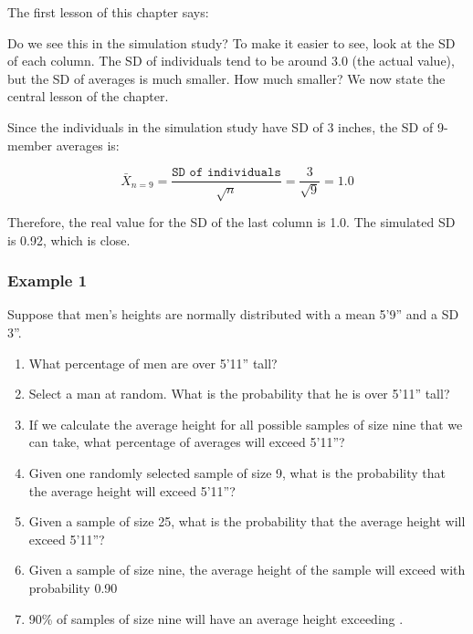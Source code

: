 \documentclass[11pt, chapterprefix=true]{scrbook}\usepackage[]{graphicx}\usepackage[]{color}
\begin{document}
The first lesson of this chapter says:


Do we see this in the simulation study?  To make it easier to see, look at the SD of each column.  The SD of individuals tend to be around 3.0 (the actual value), but the SD of averages is much smaller.  How much smaller?  We now state the central lesson of the chapter.


Since the individuals in the simulation study have SD of 3 inches, the SD of 9-member averages is:

\begin{equation*}
\bar{X}_{n=9} = \frac{\texttt{SD of individuals}}{\sqrt{n} } = \frac{3}{\sqrt{9}} = 1.0 
\end{equation*}

Therefore, the real value for the SD of the last column is 1.0.  The simulated SD is 0.92, which is close.

\subsubsection{Example 1}

Suppose that men's heights are normally distributed with a mean 5'9'' and a SD 3''.
  
  \begin{enumerate}
  \item What percentage of men are over 5'11'' tall?
  \item Select a man at random.  What is the probability that he is over 5'11'' tall?
  \item If we calculate the average height for all possible samples of size nine that we can take, what percentage of averages will exceed 5'11''?
  \item Given one randomly selected sample of size 9, what is the probability that the average height will exceed 5'11''?
  \item Given a sample of size 25, what is the probability that the average height will exceed 5'11''?
  \item Given a sample of size nine, the average height of the sample will exceed \underline{\phantom{xxxxxxxx}} with probability 0.90
  \item 90\% of samples of size nine will have an average height exceeding \underline{\phantom{xxxxxxxx}}.
  \end{enumerate}
\end{document}
